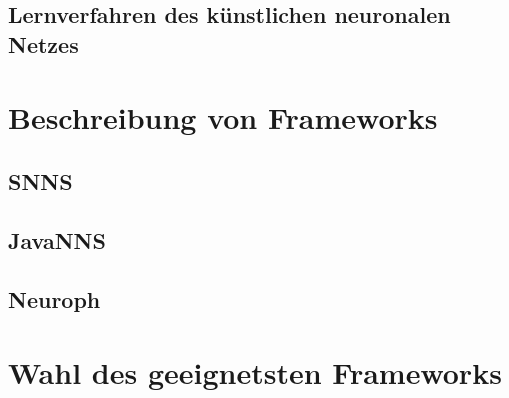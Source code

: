 \subsection{Lernverfahren des künstlichen neuronalen Netzes} 
\label{subsection:Lernverfahren des künstlichen neuronalen Netzes} 


\section{Beschreibung von Frameworks} %
\label{section:Beschreibung von Frameworks} %

\subsection{SNNS} %
\label{subsection:SNNS} %

\subsection{JavaNNS}  %
\label{subsection:JavaNNS}  %

\subsection{Neuroph} %
\label{subsection:Neuroph} %

\section{Wahl des geeignetsten Frameworks} %
\label{section:Wahl des geeignetsten Frameworks} %

